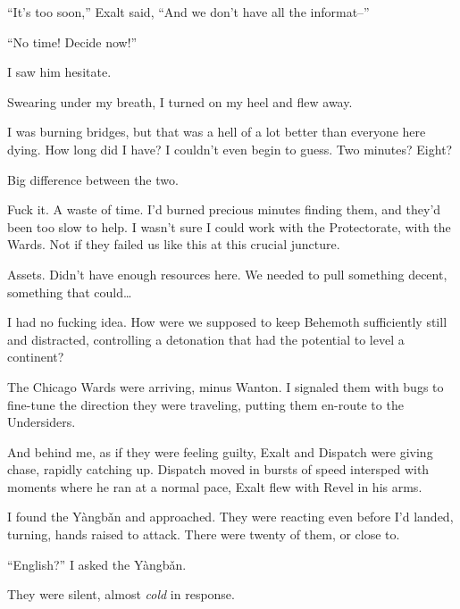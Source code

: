 ``It's too soon,'' Exalt said, ``And we don't have all the informat--''



``No time!  Decide now!''



I saw him hesitate.



Swearing under my breath, I turned on my heel and flew away.



I was burning bridges, but that was a hell of a lot better than everyone here dying.  How long did I have?  I couldn't even begin to guess.  Two minutes?  Eight?



Big difference between the two.



Fuck it.  A waste of time.  I'd burned precious minutes finding them, and they'd been too slow to help.  I wasn't sure I could work with the Protectorate, with the Wards.  Not if they failed us like this at this crucial juncture.



Assets.  Didn't have enough resources here.  We needed to pull something decent, something that could\ldots



I had no fucking idea.  How were we supposed to keep Behemoth sufficiently still and distracted, controlling a detonation that had the potential to level a continent?



The Chicago Wards were arriving, minus Wanton.  I signaled them with bugs to fine-tune the direction they were traveling, putting them en-route to the Undersiders.



And behind me, as if they were feeling guilty, Exalt and Dispatch were giving chase, rapidly catching up.  Dispatch moved in bursts of speed intersped with moments where he ran at a normal pace, Exalt flew with Revel in his arms.



I found the Y\`{a}ngb\v{a}n and approached.  They were reacting even before I'd landed, turning, hands raised to attack.  There were twenty of them, or close to.



``English?'' I asked the Y\`{a}ngb\v{a}n.



They were silent, almost \emph{cold} in response.



